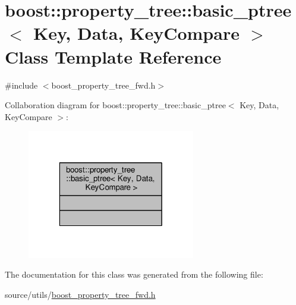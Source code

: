\hypertarget{classboost_1_1property__tree_1_1basic__ptree}{\section{boost\-:\-:property\-\_\-tree\-:\-:basic\-\_\-ptree$<$ Key, Data, Key\-Compare $>$ Class Template Reference}
\label{classboost_1_1property__tree_1_1basic__ptree}
}


{\ttfamily \#include $<$boost\-\_\-property\-\_\-tree\-\_\-fwd.\-h$>$}



Collaboration diagram for boost\-:\-:property\-\_\-tree\-:\-:basic\-\_\-ptree$<$ Key, Data, Key\-Compare $>$\-:\nopagebreak
\begin{figure}[H]
\begin{center}
\leavevmode
\includegraphics[width=208pt]{classboost_1_1property__tree_1_1basic__ptree__coll__graph}
\end{center}
\end{figure}


The documentation for this class was generated from the following file\-:\begin{DoxyCompactItemize}
\item 
source/utils/\hyperlink{boost__property__tree__fwd_8h}{boost\-\_\-property\-\_\-tree\-\_\-fwd.\-h}\end{DoxyCompactItemize}
